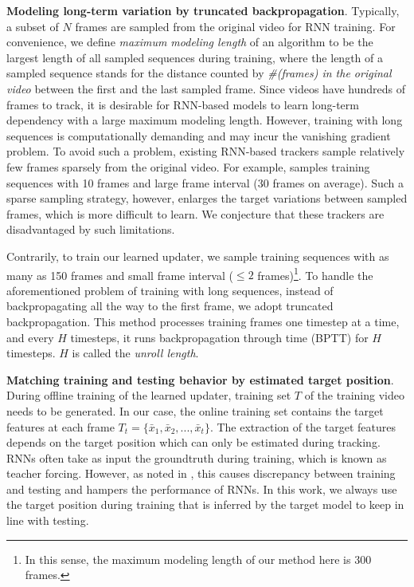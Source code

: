 \documentclass[journal]{IEEEtran}
\begin{document}
\textbf{Modeling long-term variation by truncated backpropagation}. Typically, a subset of $N$ frames are sampled from the original video for RNN training. For convenience, we define \emph{maximum modeling length} of an algorithm to be the largest length of all sampled sequences during training, where the length of a sampled sequence stands for the distance counted by \emph{\#(frames) in the original video} between the first and the last sampled frame. Since videos have hundreds of frames to track, it is desirable for RNN-based models to learn long-term dependency with a large maximum modeling length. However, training with long sequences is computationally demanding and may incur the vanishing gradient problem. To avoid such a problem, existing RNN-based trackers sample relatively few frames sparsely from the original video. For example, \cite{yang2017recurrent} samples training sequences with 10 frames and large frame interval (30 frames on average). Such a sparse sampling strategy, however, enlarges the target variations between sampled frames, which is more difficult to learn. We conjecture that these trackers are disadvantaged by such limitations. 

Contrarily, to train our learned updater, we sample training sequences with as many as 150 frames and small frame interval ($\leq 2$ frames)\footnote{In this sense, the maximum modeling length of our method here is 300 frames.}. To handle the aforementioned problem of training with long sequences, instead of backpropagating all the way to the first frame, we adopt truncated backpropagation. This method processes training frames one timestep at a time, and every $H$ timesteps, it runs backpropagation through time (BPTT) for $H$ timesteps. $H$ is called the \emph{unroll length}.

\textbf{Matching training and testing behavior by estimated target position}. During offline training of the learned updater, training set $T$ of the training video needs to be generated. In our case, the online training set contains the target features at each frame $T_t = \{\bar{x}_1, \bar{x}_2, ..., \bar{x}_t\}$. The extraction of the target features depends on the target position which can only be estimated during tracking. RNNs often take as input the groundtruth during training, which is known as teacher forcing. However, as noted in \cite{bengio2015scheduled}, this causes discrepancy between training and testing and hampers the performance of RNNs. In this work, we always use the target position during training that is inferred by the target model to keep in line with testing.
\end{document}
